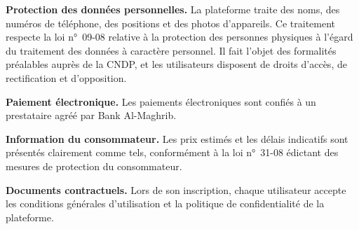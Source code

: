 \label{sec:reglementaire}

\begin{cdcitems}
  \item \textbf{Protection des données personnelles.} La plateforme traite des noms, des numéros de téléphone, des positions et des photos d’appareils. Ce traitement respecte la loi n°~09-08 relative à la protection des personnes physiques à l’égard du traitement des données à caractère personnel. Il fait l’objet des formalités préalables auprès de la CNDP, et les utilisateurs disposent de droits d’accès, de rectification et d’opposition.
  \item \textbf{Paiement électronique.} Les paiements électroniques sont confiés à un prestataire agréé par Bank Al-Maghrib.
  \item \textbf{Information du consommateur.} Les prix estimés et les délais indicatifs sont présentés clairement comme tels, conformément à la loi n°~31-08 édictant des mesures de protection du consommateur.
  \item \textbf{Documents contractuels.} Lors de son inscription, chaque utilisateur accepte les conditions générales d’utilisation et la politique de confidentialité de la plateforme.
\end{cdcitems}
